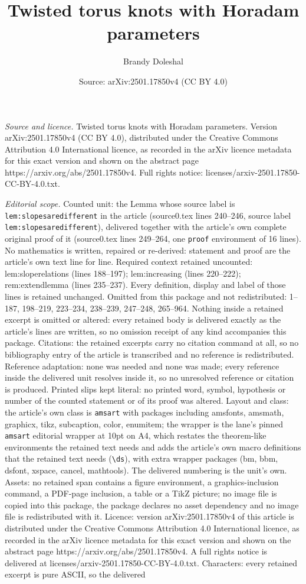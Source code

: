 \documentclass[10pt,a4paper]{amsart}
\title[Twisted torus knots with Horadam parameters]{Twisted torus knots with Horadam parameters}
\author{Brandy Doleshal}
\date{Source: arXiv:2501.17850v4 (CC BY 4.0)}
\begin{document}
\maketitle

\noindent\emph{Source and licence.} Twisted torus knots with Horadam parameters. Version arXiv:2501.17850v4 (CC BY 4.0), distributed under the Creative Commons Attribution 4.0 International licence, as recorded in the arXiv licence metadata for this exact version and shown on the abstract page https://arxiv.org/abs/2501.17850v4. Full rights notice: licenses/arxiv-2501.17850-CC-BY-4.0.txt.\par\smallskip

\noindent\textit{Editorial scope.} Counted unit: the Lemma whose source label is \texttt{lem:slopesaredifferent} in the article (source0.tex lines 240--246, source label \texttt{lem:slopesaredifferent}), delivered together with the article's own complete original proof of it (source0.tex lines 249--264, one \texttt{proof} environment of 16 lines). No mathematics is written, repaired or re-derived: statement and proof are the article's own text line for line. Required context retained uncounted: lem:sloperelations (lines 188--197); lem:increasing (lines 220--222); rem:extendlemma (lines 235--237). Every definition, display and label of those lines is retained unchanged. Omitted from this package and not redistributed: 1--187, 198--219, 223--234, 238--239, 247--248, 265--964. Nothing inside a retained excerpt is omitted or altered: every retained body is delivered exactly as the article's lines are written, so no omission receipt of any kind accompanies this package. Citations: the retained excerpts carry no citation command at all, so no bibliography entry of the article is transcribed and no reference is redistributed. Reference adaptation: none was needed and none was made; every reference inside the delivered unit resolves inside it, so no unresolved reference or citation is produced. Printed slips kept literal: no printed word, symbol, hypothesis or number of the counted statement or of its proof was altered. Layout and class: the article's own class is \texttt{amsart} with packages including amsfonts, amsmath, graphicx, tikz, subcaption, color, enumitem; the wrapper is the lane's pinned \texttt{amsart} editorial wrapper at 10pt on A4, which restates the theorem-like environments the retained text needs and adds the article's own macro definitions that the retained text needs (\texttt{\textbackslash ds}), with extra wrapper packages (bm, bbm, dsfont, xspace, cancel, mathtools). The delivered numbering is the unit's own. Assets: no retained span contains a figure environment, a graphics-inclusion command, a PDF-page inclusion, a table or a TikZ picture; no image file is copied into this package, the package declares no asset dependency and no image file is redistributed with it. Licence: version arXiv:2501.17850v4 of this article is distributed under the Creative Commons Attribution 4.0 International licence, as recorded in the arXiv licence metadata for this exact version and shown on the abstract page https://arxiv.org/abs/2501.17850v4. A full rights notice is delivered at licenses/arxiv-2501.17850-CC-BY-4.0.txt. Characters: every retained excerpt is pure ASCII, so the delivered 
\end{document}
